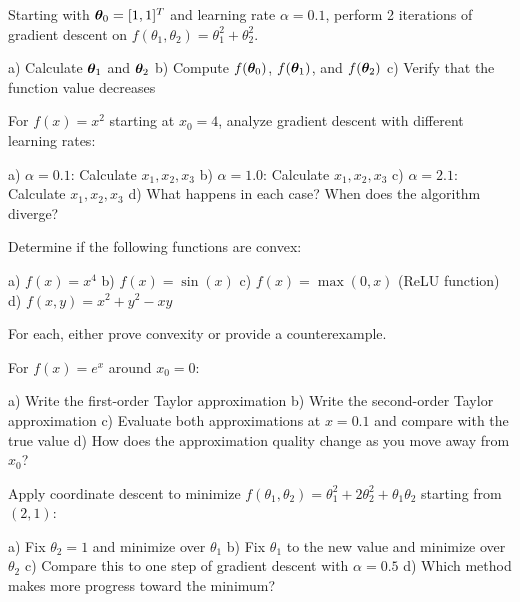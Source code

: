 \documentclass{article}
\newcounter{exercise}
\begin{document}
\begin{tcolorbox}[colback=gray!5!white,colframe=gray!75!black,title=Problem \stepcounter{exercise}: Gradient Descent Steps]

Starting with $\boldsymbol{\theta}_0 = [1, 1]^T$ and learning rate $\alpha = 0.1$, perform 2 iterations of gradient descent on $f(\theta_1, \theta_2) = \theta_1^2 + \theta_2^2$.

a) Calculate $\boldsymbol{\theta}_1$ and $\boldsymbol{\theta}_2$
b) Compute $f(\boldsymbol{\theta}_0)$, $f(\boldsymbol{\theta}_1)$, and $f(\boldsymbol{\theta}_2)$
c) Verify that the function value decreases
\end{tcolorbox}

\begin{tcolorbox}[colback=gray!5!white,colframe=gray!75!black,title=Problem \stepcounter{exercise}: Learning Rate Analysis]

For $f(x) = x^2$ starting at $x_0 = 4$, analyze gradient descent with different learning rates:

a) $\alpha = 0.1$: Calculate $x_1, x_2, x_3$
b) $\alpha = 1.0$: Calculate $x_1, x_2, x_3$  
c) $\alpha = 2.1$: Calculate $x_1, x_2, x_3$
d) What happens in each case? When does the algorithm diverge?
\end{tcolorbox}

\begin{tcolorbox}[colback=gray!5!white,colframe=gray!75!black,title=Problem \stepcounter{exercise}: Convexity Verification]

Determine if the following functions are convex:

a) $f(x) = x^4$
b) $f(x) = \sin(x)$
c) $f(x) = \max(0, x)$ (ReLU function)
d) $f(x, y) = x^2 + y^2 - xy$

For each, either prove convexity or provide a counterexample.
\end{tcolorbox}

\begin{tcolorbox}[colback=gray!5!white,colframe=gray!75!black,title=Problem \stepcounter{exercise}: Taylor Series Approximation]

For $f(x) = e^x$ around $x_0 = 0$:

a) Write the first-order Taylor approximation
b) Write the second-order Taylor approximation
c) Evaluate both approximations at $x = 0.1$ and compare with the true value
d) How does the approximation quality change as you move away from $x_0$?
\end{tcolorbox}

\begin{tcolorbox}[colback=gray!5!white,colframe=gray!75!black,title=Problem \stepcounter{exercise}: Coordinate Descent Implementation]

Apply coordinate descent to minimize $f(\theta_1, \theta_2) = \theta_1^2 + 2\theta_2^2 + \theta_1\theta_2$ starting from $(2, 1)$:

a) Fix $\theta_2 = 1$ and minimize over $\theta_1$
b) Fix $\theta_1$ to the new value and minimize over $\theta_2$
c) Compare this to one step of gradient descent with $\alpha = 0.5$
d) Which method makes more progress toward the minimum?
\end{tcolorbox}
\end{document}
